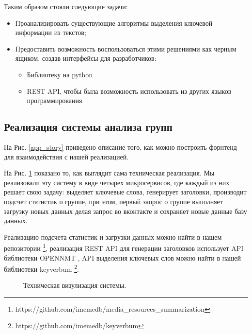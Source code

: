 \documentclass[14pt]{matmex-diploma-custom}
\begin{document}
Таким образом стояли следующие задачи:

\begin{itemize}
  \item Проанализировать существующие алгоритмы выделения ключевой информации из текстов;
  \item Предоставить возможность воспользоваться этими решениями как черным ящиком, создав интерфейсы для разработчиков:
  \begin{itemize}
    \item Библиотеку на python
    \item REST API, чтобы была возможность использовать из других языков программирования
  \end{itemize}
\end{itemize}

\subsection{Реализация системы анализа групп}

На Рис. \ref{app_story} приведено описание того, как можно построить форнтенд для взаимодействия с нашей реализацией.

На Рис. \ref{img:techincal_story} показано то, как выглядит сама техническая реализация. Мы реализовали эту систему в виде четырех микросервисов, где каждый из них решает свою задачу: выделяет ключевые слова, генерирует заголовки, производит подсчет статистик о группе, при этом, первый запрос о группе выполняет загрузку новых данных делая запрос во вконтакте и сохраняет новые данные базу данных.

Реализацию подсчета статистик и загрузки данных можно найти в нашем репозитории \footnote{https://github.com/imemedb/media\_resources\_summarization}, реализация REST API для генерации заголовков использует API библиотеки OPENNMT \cite{2017opennmt}, API выделения ключевых слов можно найти в нашей библиотеки keyverbum \footnote{https://github.com/imemedb/keyverbum}.

\begin{figure}[ht]
\begin{center}


\caption{
\label{img:techincal_story} Техническая визулизация системы.
        }
\end {center}
\end {figure}
\end{document}
